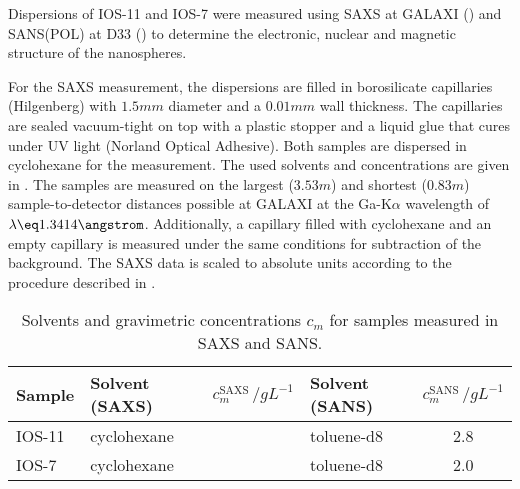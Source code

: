 \documentclass[\main/dresen_thesis.tex]{subfiles}
\begin{document}

    Dispersions of IOS-11 and IOS-7 were measured using SAXS at GALAXI () and SANS(POL) at D33 () to determine the electronic, nuclear and magnetic structure of the nanospheres.

    For the SAXS measurement, the dispersions are filled in borosilicate capillaries (Hilgenberg) with $1.5 \unit{mm}$ diameter and a $0.01 \unit{mm}$ wall thickness.
    The capillaries are sealed vacuum-tight on top with a plastic stopper and a liquid glue that cures under UV light (Norland Optical Adhesive).
    Both samples are dispersed in cyclohexane for the measurement.
    The used solvents and concentrations are given in .
    The samples are measured on the largest ($3.53 \unit{m}$) and shortest ($0.83 \unit{m}$) sample-to-detector distances possible at GALAXI at the Ga-K$\alpha$ wavelength of $\lambda \eq 1.3414 \angstrom$.
    Additionally, a capillary filled with cyclohexane and an empty capillary is measured under the same conditions for subtraction of the background.
    The SAXS data is scaled to absolute units according to the procedure described in .

    \begin{table}[!htbp]
      \centering
      \caption{\label{tab:monolayers:charMethod:sampleConcentrations}Solvents and gravimetric concentrations $c_m$ for samples measured in SAXS and SANS.}
      \begin{tabular}{ l | l | c | l | c }
        \textbf{Sample}  & Solvent (SAXS) & $c_m^\mathrm{SAXS} \,/ \unit{gL^{-1}}$ & Solvent (SANS) & $c_m^\mathrm{SANS}\,/ \unit{gL^{-1}}$\\
        \hline
        IOS-11 & cyclohexane   &                  & toluene-d8       & 2.8\\
        IOS-7  & cyclohexane   &                  & toluene-d8       & 2.0\\
        \hline
      \end{tabular}
    \end{table}
\end{document}
